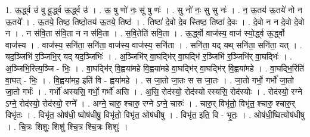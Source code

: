 \documentclass[17pt]{extarticle}
\begin{document}
1. ऊ॒र्द्ध्व उ॑ वु वू॒र्द्ध्व ऊ॒र्द्ध्व उ॑ । . ऊ॒ षु णो॑ नः॒ सू॑ षु णः॑ । . सु नो॑ नः॒ सु सु नः॑ । . न॒ ऊ॒तय॑ ऊ॒तये॑ नो न ऊ॒तये᳚ । . ऊ॒तये॒ तिष्ठ॒ तिष्ठो॒तय॑ ऊ॒तये॒ तिष्ठ॑ । . तिष्ठा॑ दे॒वो दे॒व स्तिष्ठ॒ तिष्ठा॑ दे॒वः । . दे॒वो न न दे॒वो दे॒वो न । . न स॑वि॒ता स॑वि॒ता न न स॑वि॒ता । . स॒वि॒तेति॑ सवि॒ता । . ऊ॒र्द्ध्वो वाज॑स्य॒ वाज॑ स्यो॒र्द्ध्व ऊ॒र्द्ध्वो वाज॑स्य । . वाज॑स्य॒ सनि॑ता॒ सनि॑ता॒ वाज॑स्य॒ वाज॑स्य॒ सनि॑ता । . सनि॑ता॒ यद् यथ् सनि॑ता॒ सनि॑ता॒ यत् । . यद॒ञ्जिभि॑ र॒ञ्जिभि॒र् यद् यद॒ञ्जिभिः॑ । . अ॒ञ्जिभि॑र् वा॒घद्भि॑र् वा॒घद्भि॑ र॒ञ्जिभि॑ र॒ञ्जिभि॑र् वा॒घद्भिः॑ । . अ॒ञ्जिभि॒रित्य॒ञ्जि - भिः॒ । . वा॒घद्भि॑र् वि॒ह्वया॑महे वि॒ह्वया॑महे वा॒घद्भि॑र् वा॒घद्भि॑र् वि॒ह्वया॑महे । . वा॒घद्भि॒रिति॑ वा॒घत् - भिः॒ । . वि॒ह्वया॑मह॒ इति॑ वि - ह्वया॑महे । . स जा॒तो जा॒तः स स जा॒तः । . जा॒तो गर्भो॒ गर्भो॑ जा॒तो जा॒तो गर्भः॑ । . गर्भो॑ अस्यसि॒ गर्भो॒ गर्भो॑ असि । . अ॒सि॒ रोद॑स्यो॒ रोद॑स्यो रस्यसि॒ रोद॑स्योः । . रोद॑स्यो॒ रग्ने ऽग्ने॒ रोद॑स्यो॒ रोद॑स्यो॒ रग्ने᳚ । . अग्ने॒ चारु॒ श्चारु॒ रग्ने ऽग्ने॒ चारुः॑ । . चारु॒र् विभृ॑तो॒ विभृ॑त॒ श्चारु॒ श्चारु॒र् विभृ॑तः । . विभृ॑त॒ ओष॑धी॒ ष्वोष॑धीषु॒ विभृ॑तो॒ विभृ॑त॒ ओष॑धीषु । . विभृ॑त॒ इति॒ वि - भृ॒तः॒ । . ओष॑धी॒ष्वित्योष॑धीषु । . चि॒त्रः शिशुः॒ शिशु॑ श्चि॒त्र श्चि॒त्रः शिशुः॑ । \newline
\end{document}
